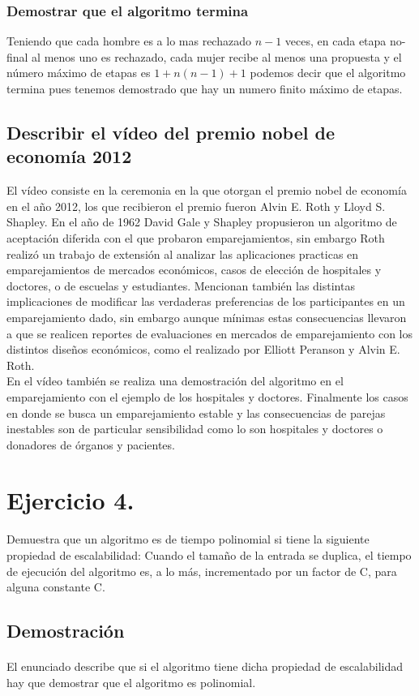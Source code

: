 \documentclass[12pt]{article}
\begin{document}
\subsubsection{Demostrar que el algoritmo termina}
Teniendo que cada hombre es a lo mas rechazado $n-1$ veces, en cada etapa no-final al menos uno es rechazado, cada mujer recibe al menos una propuesta y el número máximo de etapas es $1 + n(n-1) + 1$ podemos decir que el algoritmo termina pues tenemos demostrado que hay un numero finito máximo de etapas.
\subsection{Describir el vídeo del premio nobel de economía 2012}
El vídeo consiste en la ceremonia en la que otorgan el premio nobel de economía en el año 2012, los que recibieron el premio fueron Alvin E. Roth y Lloyd S. Shapley. En el año de 1962  David Gale y Shapley propusieron un algoritmo de aceptación diferida  con el que probaron emparejamientos, sin embargo Roth realizó un trabajo de extensión al analizar las aplicaciones practicas en emparejamientos de mercados económicos, casos de elección de hospitales y doctores, o de escuelas y estudiantes. Mencionan también las distintas implicaciones de modificar las verdaderas preferencias de los participantes en un emparejamiento dado, sin embargo aunque mínimas estas consecuencias llevaron a que se realicen reportes de evaluaciones en mercados de emparejamiento con los distintos diseños económicos, como el realizado por Elliott Peranson y Alvin E. Roth. \\
En el vídeo también se realiza una demostración del algoritmo en el emparejamiento con el ejemplo de los hospitales y doctores. Finalmente los casos en donde se busca un emparejamiento estable y las consecuencias de parejas inestables son de particular sensibilidad como lo son hospitales y doctores o donadores de órganos y pacientes. 
\section{Ejercicio 4.}
Demuestra que un algoritmo es de tiempo polinomial si tiene la siguiente propiedad de escalabilidad: Cuando el tamaño de la entrada se duplica, el tiempo de ejecución del algoritmo es, a lo más, incrementado por un factor de C, para alguna constante C.
\subsection{Demostración}
\paragraph{}
El enunciado describe que si el algoritmo tiene dicha propiedad de escalabilidad hay que demostrar que el algoritmo es polinomial.
\end{document}
